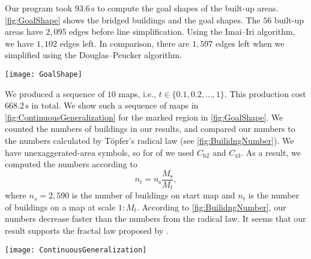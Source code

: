 Our program took $93.6\,\mathrm{s}$ 
to compute the goal shapes of the built-up areas.
\fig\ref{fig:GoalShape} shows the bridged buildings and the goal shapes.
The $56$ built-up areas have $2{,}095$ edges before line simplification.
Using the Imai--Iri algorithm, we have $1{,}102$ edges left.
In comparison, there are $1{,}597$ edges left when we simplified using
the Douglas--Peucker algorithm.

\begin{figure*}[tb]
	\centering
	\texttt{[image: GoalShape]}
	\caption{Bridged original buildings 
		and goal shapes of the built-up areas (without removing small holes), 
		at scale $1:50{,}000$.
		There are $56$ built-up areas, which have $1{,}102$ edges in total.
		We show a sequence of maps in \fig\ref{fig:ContinuousGeneralization} 
		for the region marked by the dashed circle.
	}
	\label{fig:GoalShape}
\end{figure*}


We produced a sequence of $10$ maps, i.e., $t \in \{0.1, 0.2, \dots, 1\}$.
This production cost $668.2\,\mathrm{s}$ in total.
We show such a sequence of maps in \fig\ref{fig:ContinuousGeneralization} for 
the marked region in \fig\ref{fig:GoalShape}.
We counted the numbers of buildings in our results,
and compared our numbers to the numbers calculated by T\"opfer's radical law
(see \fig\ref{fig:BuilidngNumber}).
We have unexaggerated-area symbols, 
so for  of \citet{Topfer1966} we used $C_\mathrm{b2}$ and $C_\mathrm{z3}$.
As a result, we computed the numbers according to
\[
n_t=n_\mathrm{s}\frac{M_\mathrm{s}}{M_t},
\]
where $n_s=2{,}590$ is the number of buildings on start map
and $n_t$ is the number of buildings on a map at scale $1:M_t$.
According to \fig\ref{fig:BuilidngNumber}, our numbers decrease faster than 
the numbers from the radical law.
It seems that our result supports the fractal law proposed by \citet{Jiang2015}.

\begin{figure*}[tb]
	\centering
	\texttt{[image: ContinuousGeneralization]}
	\caption{A sequence of maps at time $t \in \{0, 0.1, 0.2, \dots, 1\}$
		for the region marked in \fig\ref{fig:GoalShape}.
	}
	\label{fig:ContinuousGeneralization}
\end{figure*}

